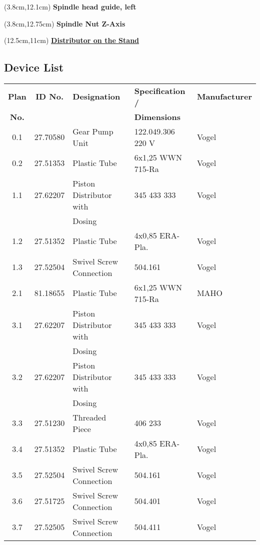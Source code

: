 \begin{textblock*}{5cm}(3.8cm,12.1cm)
    \textbf{Spindle head guide, left}
\end{textblock*}

\begin{textblock*}{5cm}(3.8cm,12.75cm)
    \textbf{Spindle Nut Z-Axis}
\end{textblock*}

\begin{textblock*}{5cm}(12.5cm,11cm)
    \textbf{\uline{Distributor on the Stand}}
\end{textblock*}

\newpage
\subsection{Device List}

\begin{table}[h]
    \centering
    \renewcommand{\arraystretch}{1.2}
    \begin{tabular}{|c|c|l|l|l|}
        \hline
        \hline
        \textbf{Plan} & \textbf{ID No.} & \textbf{Designation} & \textbf{Specification /} & \textbf{Manufacturer} \\
        \textbf{No.} &&&\textbf{Dimensions}& \\
        \hline
        \hline
        0.1 & 27.70580 & Gear Pump Unit & 122.049.306 220 V & Vogel \\
        0.2 & 27.51353 & Plastic Tube & 6x1,25 WWN 715-Ra & Vogel \\

        1.1 & 27.62207 & Piston Distributor with & 345 433 333 & Vogel \\
        && Dosing && \\
        1.2 & 27.51352 & Plastic Tube & 4x0,85 ERA-Pla. & Vogel \\
        1.3 & 27.52504 & Swivel Screw Connection & 504.161 & Vogel \\
        2.1 & 81.18655 & Plastic Tube & 6x1,25 WWN 715-Ra & MAHO \\

        3.1 & 27.62207 & Piston Distributor with & 345 433 333 & Vogel \\
        && Dosing && \\
        3.2 & 27.62207 & Piston Distributor with & 345 433 333 & Vogel \\
        && Dosing && \\
        3.3 & 27.51230 & Threaded Piece & 406 233 & Vogel \\
        3.4 & 27.51352 & Plastic Tube & 4x0,85 ERA-Pla. & Vogel \\
        3.5 & 27.52504 & Swivel Screw Connection & 504.161 & Vogel \\
        3.6 & 27.51725 & Swivel Screw Connection & 504.401 & Vogel \\
        3.7 & 27.52505 & Swivel Screw Connection & 504.411 & Vogel \\
        \hline
        \hline
    \end{tabular}
\end{table}

